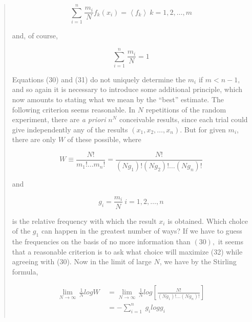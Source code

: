 \documentclass[]{article}
\begin{document}
\begin{quote}
\[\sum_{i = 1}^{n}\mspace{2mu}\frac{m_{i}}{N}f_{k}\left( x_{i} \right) = \left\langle f_{k} \right\rangle\ k = 1,2,\ldots,m\]

and, of course,

\[\sum_{i = 1}^{n}\mspace{2mu}\frac{m_{i}}{N} = 1\]

Equations (30) and (31) do not uniquely determine the \(m_{i}\) if
\(m < n - 1,\) and so again it is necessary to introduce some additional
principle, which now amounts to stating what we mean by the ``best''
estimate. The following criterion seems reasonable. In \(N\) repetitions
of the random experiment, there are \emph{a priori} \(n^{N}\)
conceivable results, since each trial could give independently any of
the results \(\left( x_{1},x_{2},\ldots,x_{n} \right)\). But for given
\(m_{i}\), there are only \(W\) of these possible, where

\[W \equiv \frac{N!}{m_{1}!\ldots m_{n}!} = \frac{N!}{\left( Ng_{1} \right)!\left( Ng_{2} \right)!\ldots\left( Ng_{n} \right)!}\]

and

\[g_{i} = \frac{m_{i}}{N}\ i = 1,2,\ldots,n\]

is the relative frequency with which the result \(x_{i}\) is obtained.
Which cholce of the \(g_{1}\) can happen in the greatest number of ways?
If we have to guess the frequencies on the basis of no more information
than \((30),\) it seems that a reasonable criterion is to ask what
choice will maximize (32) while agreeing with (30). Now in the limit of
large \(N\), we have by the Stirling formula,

\[\begin{matrix}
\lim_{N \rightarrow \infty}\mspace{2mu}\frac{1}{N}logW & \  = \lim_{N \rightarrow \infty}\mspace{2mu}\frac{1}{N}log\left\lbrack \frac{N!}{\left( Ng_{1} \right)!\ldots\left( Ng_{n} \right)!} \right\rbrack \\
 & \  = - \sum_{i = 1}^{n}\mspace{2mu}\mspace{2mu} g_{i}logg_{i} \\
\end{matrix}\]


\end{quote}
\end{document}

